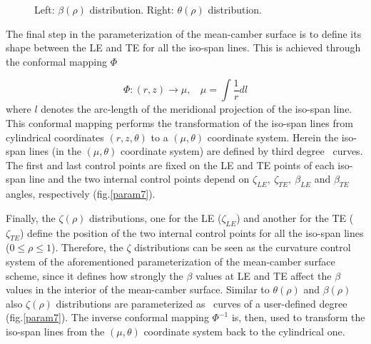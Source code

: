 \begin{figure}[h!]
\begin{minipage}[b]{1\linewidth}
 \centering
\end{minipage}
\caption{Left: $\beta(\rho)$ distribution. Right: $\theta(\rho)$ distribution.}
\label{param4}
\end{figure}

The final step in the parameterization of the mean-camber surface is to define its shape between the LE and TE for all the iso-span lines. This is achieved through the conformal mapping $\Phi$


\begin{equation} 
   \Phi:(r,z)\rightarrow \mu, ~~~~\mu=\int{\frac{1}{r}dl}
   \label{phi1} 
\end{equation}
where $l$ denotes the arc-length of the meridional projection of the iso-span line. This conformal mapping performs the transformation of the iso-span lines from cylindrical coordinates $(r,z,\theta)$ to a $(\mu,\theta)$ coordinate system. Herein the iso-span lines (in the $(\mu,\theta)$ coordinate system) are defined by third degree \Bezier\ curves. The first and last control points are fixed on the LE and TE points of each iso-span line and the two internal control points depend on $\zeta_{LE}, ~\zeta_{TE}, ~\beta_{LE}$ and $\beta_{TE}$ angles, respectively (fig.\ref{param7}).
  
Finally, the $\zeta(\rho)$ distributions, one for the LE ($\zeta_{LE}$) and another for the TE ($\zeta_{TE}$) define the position of the two internal control points for all the iso-span lines ($0\leq\rho\leq1$). Therefore, the $\zeta$ distributions can be seen as the curvature control system of the aforementioned parameterization of the mean-camber surface scheme, since it defines how strongly the $\beta$ values at LE and TE affect the $\beta$ values in the interior of the mean-camber surface. Similar to $\theta(\rho)$ and $\beta(\rho)$ also $\zeta(\rho)$ distributions are parameterized as \Bezier\ curves of a user-defined degree (fig.\ref{param7}). The inverse conformal mapping $\Phi^{-1}$ is, then, used to transform the iso-span lines from the $(\mu,\theta)$ coordinate system back to the cylindrical one. 

